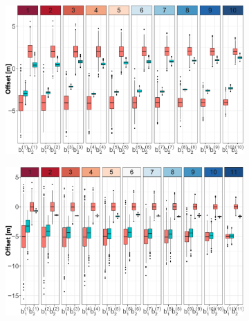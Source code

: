 \documentclass[11pt]{article}
\begin{document}
\begin{figure}[h!]
        \begin{subfigure}{0.49\textwidth}
            \centering
            \includegraphics[width=\linewidth]{Figs/7c-bs_Pt.pdf}
            \caption{}
            \label{subfig:B'sPt}
        \end{subfigure}
        \begin{subfigure}{0.49\textwidth}
            \centering
            \includegraphics[width=\linewidth]{Figs/7d-bs_Restit.pdf}
            \caption{}
            \label{subfig:B'sRes}
        \end{subfigure}
        

\end{figure}
\end{document}
